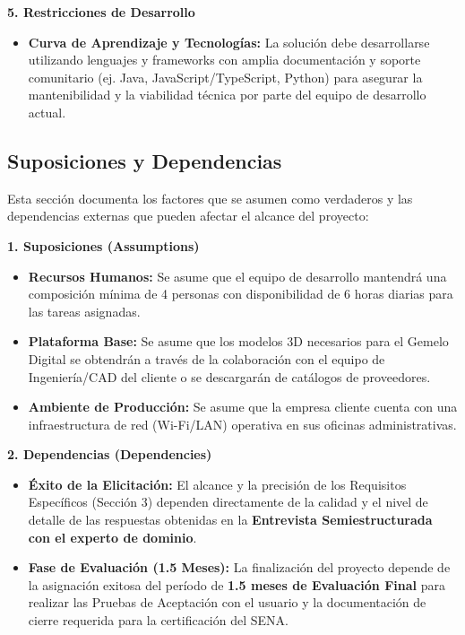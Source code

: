 \textbf{5. Restricciones de Desarrollo}
\begin{itemize}
    \item \textbf{Curva de Aprendizaje y Tecnologías:} La solución debe desarrollarse utilizando lenguajes y frameworks con amplia documentación y soporte comunitario (ej. Java, JavaScript/TypeScript, Python) para asegurar la mantenibilidad y la viabilidad técnica por parte del equipo de desarrollo actual.
\end{itemize}

\subsection{Suposiciones y Dependencias}
Esta sección documenta los factores que se asumen como verdaderos y las dependencias externas que pueden afectar el alcance del proyecto:

\textbf{1. Suposiciones (Assumptions)}
\begin{itemize}
    \item \textbf{Recursos Humanos:} Se asume que el equipo de desarrollo mantendrá una composición mínima de 4 personas con disponibilidad de 6 horas diarias para las tareas asignadas.
    \item \textbf{Plataforma Base:} Se asume que los modelos 3D necesarios para el Gemelo Digital se obtendrán a través de la colaboración con el equipo de Ingeniería/CAD del cliente o se descargarán de catálogos de proveedores.
    \item \textbf{Ambiente de Producción:} Se asume que la empresa cliente cuenta con una infraestructura de red (Wi-Fi/LAN) operativa en sus oficinas administrativas.
\end{itemize}

\textbf{2. Dependencias (Dependencies)}
\begin{itemize}
    \item \textbf{Éxito de la Elicitación:} El alcance y la precisión de los Requisitos Específicos (Sección 3) dependen directamente de la calidad y el nivel de detalle de las respuestas obtenidas en la \textbf{Entrevista Semiestructurada con el experto de dominio}.
    \item \textbf{Fase de Evaluación (1.5 Meses):} La finalización del proyecto depende de la asignación exitosa del período de \textbf{1.5 meses de Evaluación Final} para realizar las Pruebas de Aceptación con el usuario y la documentación de cierre requerida para la certificación del SENA.
\end{itemize}


